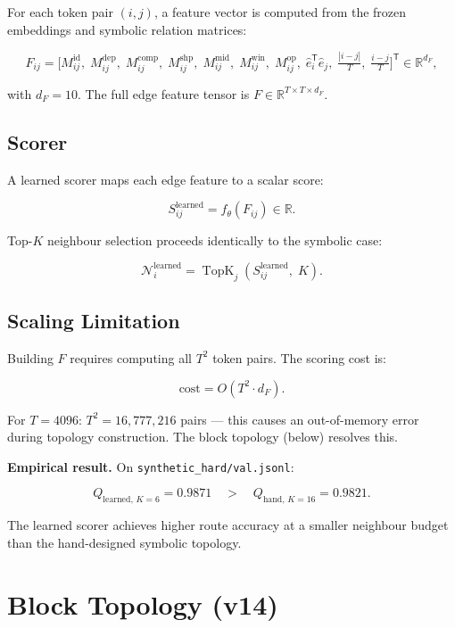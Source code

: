 \documentclass[11pt]{article}
\newcommand{\R}{\mathbb{R}}
\newcommand{\TopK}{\operatorname{TopK}}
\begin{document}
For each token pair $(i,j)$, a feature vector is computed from the
frozen embeddings and symbolic relation matrices:

\[
F_{ij} =
\bigl[
  M^{\text{id}}_{ij},\;
  M^{\text{dep}}_{ij},\;
  M^{\text{comp}}_{ij},\;
  M^{\text{shp}}_{ij},\;
  M^{\text{mid}}_{ij},\;
  M^{\text{win}}_{ij},\;
  M^{\text{op}}_{ij},\;
  \hat{e}_i^{\mathsf{T}}\hat{e}_j,\;
  \tfrac{|i-j|}{T},\;
  \tfrac{i-j}{T}
\bigr]^{\mathsf{T}}
\in \R^{d_F},
\]

with $d_F = 10$.  The full edge feature tensor is
$F \in \R^{T \times T \times d_F}$.

\subsection*{Scorer}

A learned scorer maps each edge feature to a scalar score:

\[
S_{ij}^{\text{learned}} = f_\theta(F_{ij}) \in \R.
\]

Top-$K$ neighbour selection proceeds identically to the symbolic case:

\[
\mathcal{N}_i^{\text{learned}}
= \TopK_j\!\left(S_{ij}^{\text{learned}},\; K\right).
\]

\subsection*{Scaling Limitation}

Building $F$ requires computing all $T^2$ token pairs.
The scoring cost is:

\[
\text{cost} = O(T^2 \cdot d_F).
\]

For $T = 4096$: $T^2 = 16{,}777{,}216$ pairs --- this causes an
out-of-memory error during topology construction.
The block topology (below) resolves this.

\medskip
\textbf{Empirical result.}  On \texttt{synthetic\_hard/val.jsonl}:

\[
Q_{\text{learned},\,K=6} = 0.9871
\quad>\quad
Q_{\text{hand},\,K=16} = 0.9821.
\]

The learned scorer achieves higher route accuracy at a smaller
neighbour budget than the hand-designed symbolic topology.

\section*{Block Topology (v14)}
\end{document}

